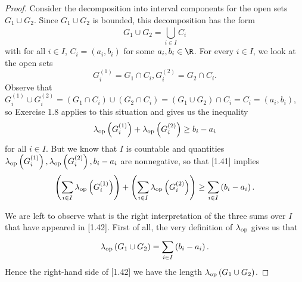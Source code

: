 \documentclass[pmath450]{subfiles}
\begin{document}
    \begin{proof}
        Consider the decomposition into interval components for the open sets $G_1\cup G_2$. Since $G_1\cup G_2$ is bounded, this decomposition has the form
        \begin{equation*}
            G_1\cup G_2 = \bigcup^{}_{i\in I}C_i
        \end{equation*}
        with for all $i\in I$, $C_i=\left( a_i,b_i \right)$ for some $a_i,b_i\in\R$. For every $i\in I$, we look at the open sets
        \begin{equation*}
            G_i^{\left( 1 \right)} = G_1\cap C_i, G_i^{\left( 2 \right)} = G_2\cap C_i.
        \end{equation*}
        Observe that $G_i^{\left( 1 \right)}\cup G_{i}^{\left( 2 \right)} = \left( G_1\cap C_i \right)\cup\left( G_2\cap C_i \right)=\left( G_1\cup G_2 \right)\cap C_i = C_i = \left( a_i,b_i \right)$, so Exercise 1.8 applies to this situation and gives us the inequality
        \begin{equation}
            \lambda_{\operatorname{op}}\left( G_i^{\left( 1 \right)} \right)+\lambda_{\operatorname{op}}\left( G_i^{\left( 2 \right)} \right)\geq b_i-a_i
        \end{equation}
        for all $i\in I$. But we know that $I$ is countable and quantities $\lambda_{\operatorname{op}}\left( G_i^{\left( 1 \right)} \right),\lambda_{\operatorname{op}}\left( G_i^{\left( 2 \right)} \right),b_i-a_i$ are nonnegative, so that [1.41] implies
        \begin{equation}
            \left( \sum^{}_{i\in I}\lambda_{\operatorname{op}}\left( G_i^{\left( 1 \right)} \right) \right) + \left( \sum^{}_{i\in I}\lambda_{\operatorname{op}}\left( G_i^{\left( 2 \right)} \right) \right) \geq \sum^{}_{i\in I} \left( b_i-a_i \right).
        \end{equation}
        
        We are left to observe what is the right interpretation of the three sums over $I$ that have appeared in [1.42]. First of all, the very definition of $\lambda_{\operatorname{op}}$ gives us that
        \begin{equation}
            \lambda_{\operatorname{op}}\left( G_1\cup G_2 \right)=\sum^{}_{i\in I}\left( b_i-a_i \right).
        \end{equation}
        Hence the right-hand side of [1.42] we have the length $\lambda_{\operatorname{op}}\left( G_1\cup G_2 \right)$.


\end{proof}
\end{document}
